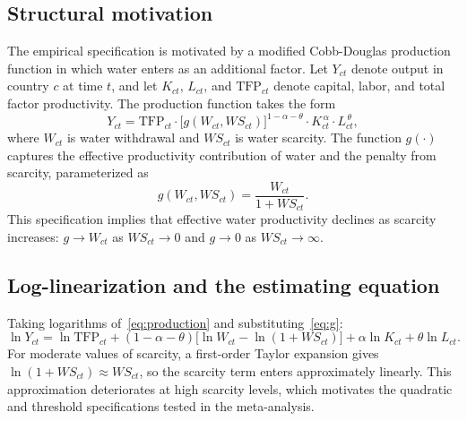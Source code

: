 \documentclass[12pt]{article}
\begin{document}
\subsection*{Structural motivation}

The empirical specification is motivated by a modified Cobb-Douglas production function in which water enters as an additional factor. Let $Y_{ct}$ denote output in country $c$ at time $t$, and let $K_{ct}$, $L_{ct}$, and $\text{TFP}_{ct}$ denote capital, labor, and total factor productivity. The production function takes the form
\begin{equation}
Y_{ct} = \text{TFP}_{ct} \cdot \bigl[g(W_{ct}, WS_{ct})\bigr]^{1-\alpha-\theta} \cdot K_{ct}^{\,\alpha} \cdot L_{ct}^{\,\theta},
\label{eq:production}
\end{equation}
where $W_{ct}$ is water withdrawal and $WS_{ct}$ is water scarcity. The function $g(\cdot)$ captures the effective productivity contribution of water and the penalty from scarcity, parameterized as
\begin{equation}
g(W_{ct}, WS_{ct}) = \frac{W_{ct}}{1 + WS_{ct}}.
\label{eq:g}
\end{equation}
This specification implies that effective water productivity declines as scarcity increases: $g \to W_{ct}$ as $WS_{ct} \to 0$ and $g \to 0$ as $WS_{ct} \to \infty$.

\subsection*{Log-linearization and the estimating equation}

Taking logarithms of~\eqref{eq:production} and substituting~\eqref{eq:g}:
\begin{equation}
\ln Y_{ct} = \ln \text{TFP}_{ct} + (1-\alpha-\theta)\bigl[\ln W_{ct} - \ln(1+WS_{ct})\bigr] + \alpha \ln K_{ct} + \theta \ln L_{ct}.
\label{eq:loglin}
\end{equation}
For moderate values of scarcity, a first-order Taylor expansion gives $\ln(1+WS_{ct}) \approx WS_{ct}$, so the scarcity term enters approximately linearly. This approximation deteriorates at high scarcity levels, which motivates the quadratic and threshold specifications tested in the meta-analysis.
\end{document}
